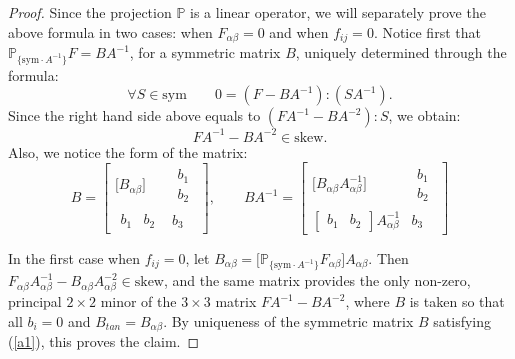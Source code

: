 \documentclass[leqno,twoside, 11pt]{amsart}
\theoremstyle{plain}
\theoremstyle{definition}
\numberwithin{equation}{section}
\numberwithin{figure}{section}
\begin{document}
\begin{proof}
Since the projection $\mathbb{P}$ is a linear operator, we will separately prove
the above formula in two cases: when $F_{\alpha\beta}=0$ and when $f_{ij}=0$.
Notice first that $\mathbb{P}_{\{\mathrm{sym}\cdot A^{-1}\}} F= BA^{-1}$, for a 
symmetric matrix $B$, uniquely determined through the formula:
$$\forall S\in\mbox{sym} \qquad 0 = (F-BA^{-1}): (SA^{-1}).$$
Since the right hand side above equals to $(FA^{-1} - BA^{-2}):S$,
we obtain:
\begin{equation}\label{a1}
FA^{-1} - BA^{-2} \in\mbox{skew}.
\end{equation}
Also, we notice the form of the matrix:
\begin{equation}\label{a2} 
B = \left[\begin{array}{cc} \Big[B_{\alpha\beta}\Big]
& \begin{array}{c} b_{1}\\ b_{2}\end{array}\\
\begin{array}{cc} b_{1} & b_{2}\end{array} & b_{3} \end{array}\right],
\qquad 
BA^{-1} = \left[\begin{array}{cc} 
\Big[B_{\alpha\beta} A_{\alpha\beta}^{-1}\Big]
& \begin{array}{c} b_{1}\\ b_{2}\end{array}\\
\left[\begin{array}{cc} b_{1} &  b_{2} \end{array}\right] A_{\alpha\beta}^{-1}
& b_{3} \end{array}\right]
\end{equation}

\medskip

In the first case when $f_{ij}=0$, let $B_{\alpha\beta} 
= \big[\mathbb{P}_{\{\mathrm{sym}\cdot A^{-1}\}} F_{\alpha\beta}\big] A_{\alpha\beta}$.
Then $F_{\alpha\beta} A_{\alpha\beta}^{-1} - B_{\alpha\beta}A_{\alpha\beta}^{-2}\in
\mbox{skew}$, and the same matrix provides the only non-zero, principal
$2\times 2$ minor of the $3\times 3$ matrix  
$F A^{-1} - BA^{-2}$, where $B$ is taken so that all $b_i=0$ and 
$B_{tan}=B_{\alpha\beta}$. By uniqueness of the symmetric matrix $B$ 
satisfying (\ref{a1}), this proves the claim.

\medskip


\end{proof}
\end{document}
